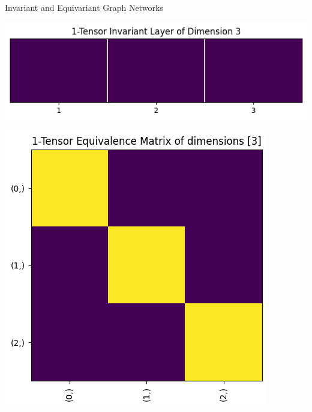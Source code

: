 \documentclass{beamer}
\begin{document}
\begin{frame}{Invariant and Equivariant Graph Networks}
    \begin{center}
        \begin{minipage}[t]{0.45\textwidth}
            \raggedright %
            \vspace{0pt} %
            \includegraphics[width=\textwidth]{../figures/1-tensor-inv.png}
        \end{minipage}
        \hfill
        \begin{minipage}[t]{0.45\textwidth}
            \raggedright %
            \vspace{0pt} %
            \includegraphics[width=\textwidth]{../figures/1-tensor-eq.png}
        \end{minipage}
    \end{center}
\end{frame}
\end{document}
